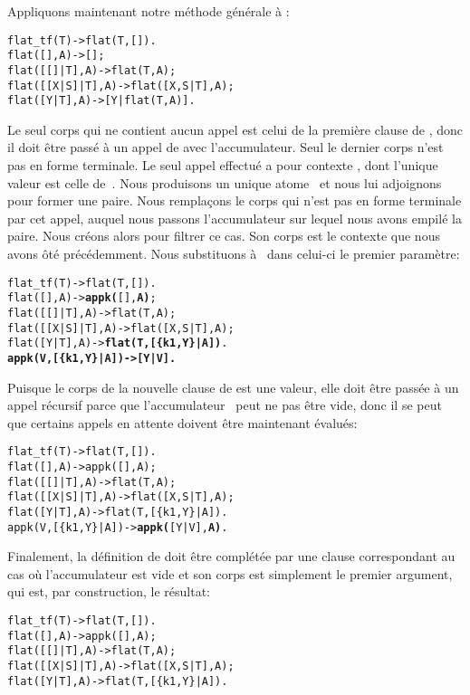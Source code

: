 \begin{enumerate}
Appliquons maintenant notre méthode générale à :
\begin{alltt}
flat\_tf(T)        -> flat(T,[]).
flat(       [],A) -> [];\hfill% A \emph{inutile pour le moment}
flat(   [[]|T],A) -> flat(T,A);
flat([[X|S]|T],A) -> flat([X,S|T],A);
flat(    [Y|T],A) -> [Y|flat(T,A)].
\end{alltt}
Le seul corps qui ne contient aucun appel est celui de la première
clause de , donc il doit être passé à un appel de
 avec l'accumulateur. Seul le dernier corps n'est pas
en forme terminale. Le seul appel effectué a pour contexte
\erlcode{[Y|\textvisiblespace]}, dont l'unique valeur est celle
de~. Nous produisons un unique atome~ et nous
lui adjoignons~ pour former une paire. Nous remplaçons le
corps qui n'est pas en forme terminale par cet appel, auquel nous
passons l'accumulateur sur lequel nous avons empilé la paire. Nous
créons alors  pour filtrer ce cas. Son corps est le
contexte que nous avons ôté précédemment. Nous substituons
à~\erlcode{\textvisiblespace} dans celui-ci le premier paramètre:
\begin{alltt}
flat_tf(T)         -> flat(T,[]).
flat(       [],A)  -> \textbf{appk(}[],\textbf{A)};
flat(   [[]|T],A)  -> flat(T,A);
flat([[X|S]|T],A)  -> flat([X,S|T],A);
flat(    [Y|T],A)  -> \textbf{flat(T,[\{k1,Y\}|A])}.
\textbf{appk(V,[\{k1,Y\}|A]) -> [Y|V].}\hfill% \emph{Le contexte était} [Y|\textvisiblespace]
\end{alltt}
Puisque le corps de la nouvelle clause de  est une
valeur, elle doit être passée à un appel récursif parce que
l'accumulateur~ peut ne pas être vide, donc il se peut que
certains appels en attente doivent être maintenant évalués:
\begin{alltt}
flat_tf(T)         -> flat(T,[]).
flat(       [],A)  -> appk([],A);
flat(   [[]|T],A)  -> flat(T,A);
flat([[X|S]|T],A)  -> flat([X,S|T],A);
flat(    [Y|T],A)  -> flat(T,[\{k1,Y\}|A]).
appk(V,[\{k1,Y\}|A]) -> \textbf{appk(}[Y|V],\textbf{A)}.
\end{alltt}
Finalement, la définition de  doit être complétée par
une clause correspondant au cas où l'accumulateur est vide et son
corps est simplement le premier argument, qui est, par construction,
le résultat:
\begin{alltt}
flat_tf(T)         -> flat(T,[]).
flat(       [],A)  -> appk([],A);
flat(   [[]|T],A)  -> flat(T,A);
flat([[X|S]|T],A)  -> flat([X,S|T],A);
flat(    [Y|T],A)  -> flat(T,[\{k1,Y\}|A]).

\end{alltt}
\end{enumerate}
